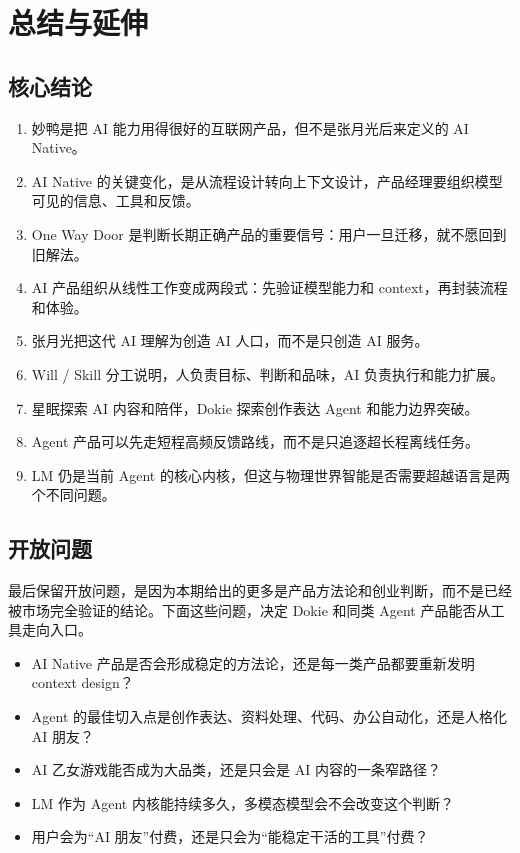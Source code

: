 \section{总结与延伸}

\subsection{核心结论}

\begin{enumerate}
\item 妙鸭是把 AI 能力用得很好的互联网产品，但不是张月光后来定义的 AI Native。
\item AI Native 的关键变化，是从流程设计转向上下文设计，产品经理要组织模型可见的信息、工具和反馈。
\item One Way Door 是判断长期正确产品的重要信号：用户一旦迁移，就不愿回到旧解法。
\item AI 产品组织从线性工作变成两段式：先验证模型能力和 context，再封装流程和体验。
\item 张月光把这代 AI 理解为创造 AI 人口，而不是只创造 AI 服务。
\item Will / Skill 分工说明，人负责目标、判断和品味，AI 负责执行和能力扩展。
\item 星眠探索 AI 内容和陪伴，Dokie 探索创作表达 Agent 和能力边界突破。
\item Agent 产品可以先走短程高频反馈路线，而不是只追逐超长程离线任务。
\item LM 仍是当前 Agent 的核心内核，但这与物理世界智能是否需要超越语言是两个不同问题。
\end{enumerate}

\subsection{开放问题}

最后保留开放问题，是因为本期给出的更多是产品方法论和创业判断，而不是已经被市场完全验证的结论。下面这些问题，决定 Dokie 和同类 Agent 产品能否从工具走向入口。

\begin{itemize}
\item AI Native 产品是否会形成稳定的方法论，还是每一类产品都要重新发明 context design？
\item Agent 的最佳切入点是创作表达、资料处理、代码、办公自动化，还是人格化 AI 朋友？
\item AI 乙女游戏能否成为大品类，还是只会是 AI 内容的一条窄路径？
\item LM 作为 Agent 内核能持续多久，多模态模型会不会改变这个判断？
\item 用户会为“AI 朋友”付费，还是只会为“能稳定干活的工具”付费？
\end{itemize}

